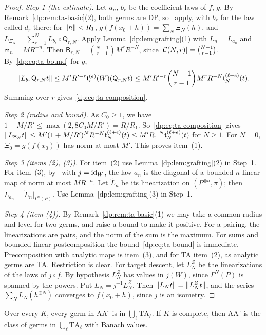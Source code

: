 \begin{proof}
\emph{Step 1 (the estimate).} Let $a_n$, $b_r$ be the coefficient laws of $f$, $g$. By Remark~\ref{dp:rem:ta-basic}(2), both germs are DP, so~\cite[Lemmas~Q.3, Q.4]{I} apply, with $b_r$ for the law called $d_r$ there: for $\lVert h\rVert<R_1$, $g(f(x_0+h))=\sum_N\Xi_N(h)$, and $L_{\Xi_N}=\sum_{r=1}^NL_{b_r}\circ\mathsf Q_{r,N}$. Apply Lemma~\ref{dp:lem:grafting}(1) with $L_n=L_{a_n}$ and $\mathsf m_n=MR^{-n}$. Then $\mathsf B_{r,N}=\binom{N-1}{r-1}M^rR^{-N}$, since $\lvert \mathcal C(N,r)\rvert=\binom{N-1}{r-1}$. By~\eqref{dp:eq:ta-bound} for $g$,
\[
 \lVert L_{b_r}\mathsf Q_{r,N}t\rVert\le M'R'^{-r}\mathfrak t^{(e)}_r(W)(\mathsf Q_{r,N}t)\le M'R'^{-r}\binom{N-1}{r-1}M^rR^{-N}\mathfrak t^{(\ell+e)}_N(t).
\]
Summing over $r$ gives~\eqref{dp:eq:ta-composition}.

\emph{Step 2 (radius and bound).} As $C_0\ge1$, we have $1+M/R'\le\max(2,8C_0M/R')=R/R_1$. So~\eqref{dp:eq:ta-composition} gives $\lVert L_{\Xi_N}t\rVert\le M'(1+M/R')^NR^{-N}\mathfrak t^{(\ell+e)}_N(t)\le M'R_1^{-N}\mathfrak t^{(\ell+e)}_N(t)$ for $N\ge1$. For $N=0$, $\Xi_0=g(f(x_0))$ has norm at most $M'$. This proves item~(1).

\emph{Step 3 (items (2), (3)).} For item~(2) use Lemma~\ref{dp:lem:grafting}(2) in Step~1. For item~(3), by~\cite[Proposition~14.9(1)]{I} with $j=\mathrm{id}_W$, the law $a_n$ is the diagonal of a bounded $n$-linear map of norm at most $MR^{-n}$. Let $\tilde L_n$ be its linearization on $(P^{\otimes n},\pi)$; then $L_{a_n}=\tilde L_n|_{\Gamma^n(P)}$. Use Lemma~\ref{dp:lem:grafting}(3) in Step~1.

\emph{Step 4 (item (4)).} By Remark~\ref{dp:rem:ta-basic}(1) we may take a common radius and level for two germs, and raise a bound to make it positive. For a pairing, the linearizations are pairs, and the norm of the sum is the maximum. For sums and bounded linear postcomposition the bound~\eqref{dp:eq:ta-bound} is immediate. Precomposition with analytic maps is item~(3), and for TA item~(2), as analytic germs are TA. Restriction is clear. For target descent, let $L^Z_N$ be the linearizations of the laws of $j\circ f$. By hypothesis $L^Z_N$ has values in $j(W)$, since $\Gamma^N(P)$ is spanned by the powers. Put $L_N=j^{-1}L^Z_N$. Then $\lVert L_Nt\rVert=\lVert L^Z_Nt\rVert$, and the series $\sum_NL_N(h^{\otimes N})$ converges to $f(x_0+h)$, since $j$ is an isometry.
\end{proof}

\begin{theorem}\label{dp:thm:composition-closure}
Over every $K$, every germ in $\mathrm{AA}^\circ$ is in $\bigcup_\ell\mathrm{TA}_\ell$. If $K$ is complete, then $\mathrm{AA}^\circ$ is the class of germs in $\bigcup_\ell\mathrm{TA}_\ell$ with Banach values.
\end{theorem}

